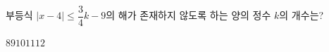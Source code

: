 부등식 $|x-4|\le \dfrac{3}{4}k-9$의 해가 존재하지 않도록 하는 양의 정수 $k$의 개수는?
\begin{choices32}{$8$}{$9$}{$10$}{$11$}{$12$}\end{choices32}
